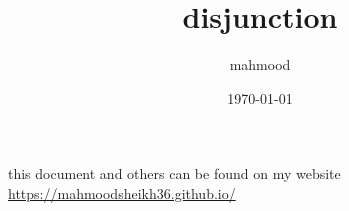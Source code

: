 \documentclass[a4paper,12pt]{article}
\author{mahmood}
\date{\today}
\title{disjunction}
\begin{document}
\maketitle
\begin{note}
this document and others can be found on my website\\
\url{https://mahmoodsheikh36.github.io/}
\end{note}
\end{document}

